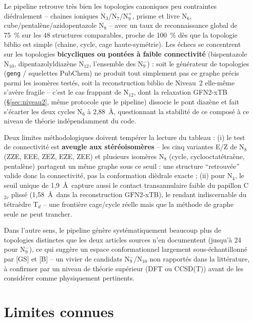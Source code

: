 \documentclass[11pt,a4paper]{article}
\begin{document}
Le pipeline retrouve tr\`es bien les topologies canoniques peu
contraintes di\'edralement -- chaines ioniques N$_3$/N$_7$/N$_9^{+}$,
prisme et livre N$_6$, cube/pental\`ene/azidopentazole N$_8$ -- avec un
taux de reconnaissance global de 75~\% sur les 48 structures
comparables, proche de 100~\% d\`es que la topologie biblio est simple
(chaine, cycle, cage haute-sym\'etrie). Les \'echecs se concentrent sur
les topologies \textbf{bicycliques ou pont\'ees \`a faible connectivit\'e}
(bispentazole N$_{10}$, dipentazolyldiaz\`ene N$_{12}$, l'ensemble des
N$_9^{-}$) : soit le g\'en\'erateur de topologies (\texttt{geng} /
squelettes PubChem) ne produit tout simplement pas ce graphe pr\'ecis
parmi les isom\`eres test\'es, soit la reconstruction biblio de Niveau~2
elle-m\^eme s'av\`ere fragile -- c'est le cas frappant de N$_{12}$, dont
la relaxation GFN2-xTB (\S\ref{sec:niveau2}, m\^eme protocole que
le pipeline) dissocie le pont diaz\`ene et fait s'\'ecarter les deux
cycles N$_6$ \`a 2{,}88~\AA, questionnant la stabilit\'e de ce compos\'e
\`a ce niveau de th\'eorie ind\'ependamment du code.

Deux limites m\'ethodologiques doivent temp\'erer la lecture du
tableau : (i) le test de connectivit\'e est \textbf{aveugle aux
st\'er\'eoisom\`eres} -- les cinq variantes E/Z de N$_8$
(ZZE, EEE, ZEZ, EZE, ZEE) et plusieurs
isom\`eres N$_8$ (cycle, cyclooctat\'etra\`ene, pental\`ene) partagent un
m\^eme graphe sous ce seuil : une structure ``retrouv\'ee'' valide donc la
connectivit\'e, pas la conformation di\`edrale exacte ; (ii) pour N$_4$,
le seuil unique de 1{,}9~\AA\ capture aussi le contact transannulaire
faible du papillon C$_{2v}$ pliss\'e (1{,}58~\AA\ dans la reconstruction
GFN2-xTB), le rendant indiscernable du t\'etra\`edre T$_d$ -- une
fronti\`ere cage/cycle r\'eelle mais que la m\'ethode de graphe seule ne
peut trancher.

Dans l'autre sens, le pipeline g\'en\`ere syst\'ematiquement beaucoup plus
de topologies distinctes que les deux articles sources n'en documentent
(jusqu'\`a 24 pour N$_9^{-}$), ce qui sugg\`ere un espace conformationnel
largement sous-\'echantillonn\'e par [GS] et [B] -- un vivier de
candidats N$_9^{-}$/N$_{10}$ non rapport\'es dans la litt\'erature, \`a
confirmer par un niveau de th\'eorie sup\'erieur (DFT ou CCSD(T)) avant de
les consid\'erer comme physiquement pertinents.

\section{Limites connues}
\label{sec:limites}
\end{document}
